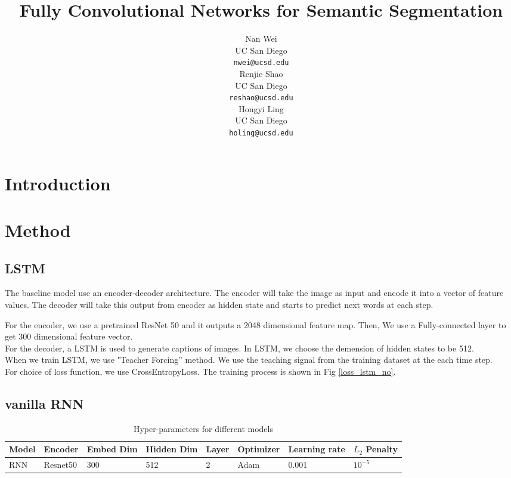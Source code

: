 \documentclass{article} %
\title{Fully Convolutional Networks for Semantic
Segmentation}
\author{
Nan Wei \\
UC San Diego\\
\texttt{nwei@ucsd.edu} \\
\And
Renjie Shao \\
UC San Diego \\
\texttt{reshao@ucsd.edu} \\
\And
Hongyi Ling \\
UC San Diego \\
\texttt{holing@ucsd.edu} \\
}
\begin{document}
\maketitle

\begin{abstract}

\end{abstract}

\section{Introduction}


\section{Method}
\subsection{LSTM}
The baseline model use an encoder-decoder architecture. 
The encoder will take the image as input and encode it into a vector of feature values.
 The decoder will take this output from encoder as hidden state and starts to predict next words at each step.

 For the encoder, we use a pretrained ResNet 50 and it outputs a  2048 dimensional feature map. Then, We use a Fully-connected layer to get 300 dimensional feature vector. \\
 For the decoder, a LSTM is used to generate captions of images. In LSTM, we choose the demension of hidden states to be 512. \\
 When we train LSTM, we use "Teacher Forcing” method. We use the teaching signal from the training dataset at the each time step.\\
 For choice of loss function, we use CrossEntropyLoss. The training process is shown in Fig \ref{loss_lstm_no}.
\subsection{vanilla RNN}

\begin{table}[!htb]
    \centering
    \begin{tabular}{l|l|l|l|l|l|l|l}
        \hline
        Model & Encoder & Embed Dim & Hidden Dim & Layer &  Optimizer & Learning rate & $L_2$ Penalty \\
		\hline
        RNN & Resnet50 & 300 & 512 & 2 & Adam & 0.001 & $10^{-5}$ \\
	    \hline
    \end{tabular}
    \caption{Hyper-parameters for different models}
    \label{acc}
\end{table}
\end{document}
